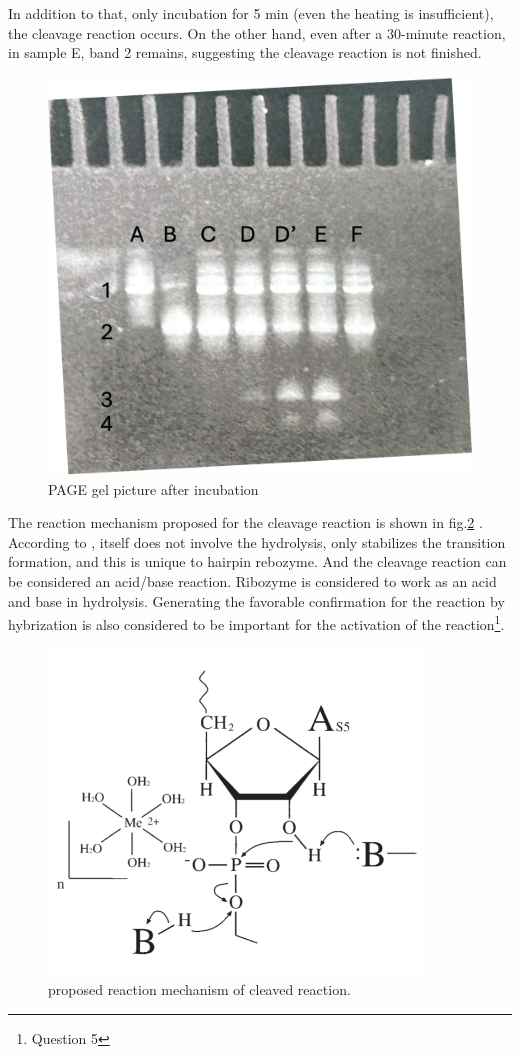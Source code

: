 \documentclass{ltjsarticle}
\theoremstyle{definition}
\numberwithin{equation}{section}
\begin{document}
In addition to that, only incubation for 5 min (even the heating is insufficient), the cleavage reaction occurs. On the other hand, even after a 30-minute reaction, in sample E, band 2 remains, suggesting the cleavage reaction is not finished.

\begin{figure}[htbp]
\begin{center}
\includegraphics[width = 10 cm]{incubation.png}
\caption{PAGE gel picture after incubation}
\label{incubation}
\end{center}
\end{figure}

The reaction mechanism proposed for the cleavage reaction is shown in fig.\ref{mechanism} \cite{mechanism}. According to \cite{mechanism},  itself does not involve the hydrolysis, only stabilizes the transition formation, and this is unique to hairpin rebozyme. And the cleavage reaction can be considered an acid/base reaction. Ribozyme is considered to work as an acid and base in hydrolysis. Generating the favorable confirmation for the reaction by hybrization is also considered to be important for the activation of the reaction\footnote{Question 5}.

\begin{figure}[htbp]
\begin{center}
\includegraphics[width = 10cm]{mechanism.png}
\caption{proposed reaction mechanism of cleaved reaction. }
\label{mechanism}
\end{center}
\end{figure}
\end{document}
